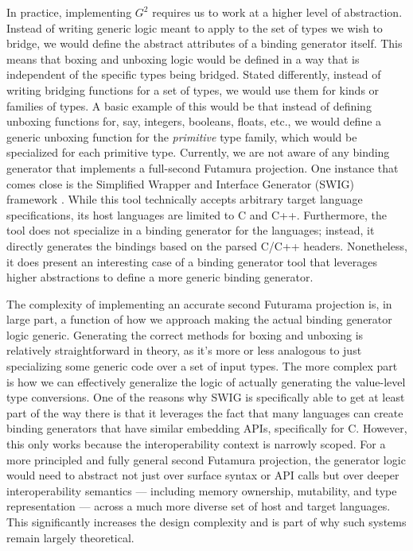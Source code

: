 In practice, implementing $G^2$ requires us to work at a higher level of abstraction. Instead of writing generic logic meant to apply to the set of types we wish to bridge, we would define the abstract attributes of a binding generator itself. This means that boxing and unboxing logic would be defined in a way that is independent of the specific types being bridged. Stated differently, instead of writing bridging functions for a set of types, we would use them for kinds or families of types. A basic example of this would be that instead of defining unboxing functions for, say, integers, booleans, floats, etc., we would define a generic unboxing function for the \textit{primitive} type family, which would be specialized for each primitive type. Currently, we are not aware of any binding generator that implements a full-second Futamura projection. One instance that comes close is the Simplified Wrapper and Interface Generator (SWIG) framework \cite{Fulton2025swig}. While this tool technically accepts arbitrary target language specifications, its host languages are limited to C and C++. Furthermore, the tool does not specialize in a binding generator for the languages; instead, it directly generates the bindings based on the parsed C/C++ headers. Nonetheless, it does present an interesting case of a binding generator tool that leverages higher abstractions to define a more generic binding generator.   

The complexity of implementing an accurate second Futurama projection is, in large part, a function of how we approach making the actual binding generator logic generic. Generating the correct methods for boxing and unboxing is relatively straightforward in theory, as it's more or less analogous to just specializing some generic code over a set of input types. The more complex part is how we can effectively generalize the logic of actually generating the value-level type conversions. One of the reasons why SWIG is specifically able to get at least part of the way there is that it leverages the fact that many languages can create binding generators that have similar embedding APIs, specifically for C. However, this only works because the interoperability context is narrowly scoped. For a more principled and fully general second Futamura projection, the generator logic would need to abstract not just over surface syntax or API calls but over deeper interoperability semantics — including memory ownership, mutability, and type representation — across a much more diverse set of host and target languages. This significantly increases the design complexity and is part of why such systems remain largely theoretical.

